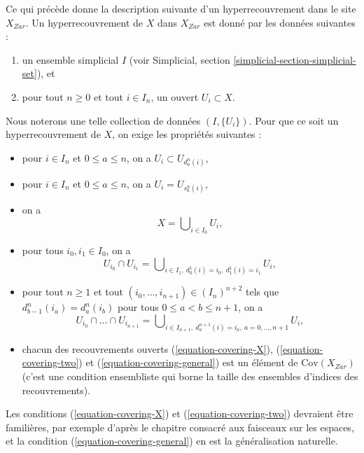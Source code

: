 \medskip\noindent
Ce qui précède donne la description suivante d'un hyperrecouvrement
dans le site $X_{Zar}$. Un hyperrecouvrement de $X$ dans $X_{Zar}$
est donné par les données suivantes :
\begin{enumerate}
\item un ensemble simplicial $I$ (voir
Simplicial, section \ref{simplicial-section-simplicial-set}), et
\item pour tout $n \geq 0$ et tout $i \in I_n$, un ouvert $U_i \subset X$.
\end{enumerate}
Nous noterons une telle collection de données $(I, \{U_i\})$.
Pour que ce soit un hyperrecouvrement de $X$, on exige
les propriétés suivantes :
\begin{itemize}
\item pour $i \in I_n$ et $0 \leq a \leq n$,
on a $U_i \subset U_{d^n_a(i)}$,
\item pour $i \in I_n$ et $0 \leq a \leq n$, on a $U_i = U_{s^n_a(i)}$,
\item on a
\begin{equation}
\label{equation-covering-X}
X = \bigcup\nolimits_{i \in I_0} U_i,
\end{equation}
\item pour tous $i_0, i_1 \in I_0$, on a
\begin{equation}
\label{equation-covering-two}
U_{i_0} \cap U_{i_1} =
\bigcup\nolimits_{i \in I_1, \ d^1_0(i) = i_0, \ d^1_1(i) = i_1} U_i,
\end{equation}
\item pour tout $n \geq 1$ et tout
$(i_0, \ldots, i_{n + 1}) \in (I_n)^{n + 2}$ tels que
$d^n_{b - 1}(i_a) = d^n_a(i_b)$ pour tous $0\leq a < b\leq n + 1$,
on a
\begin{equation}
\label{equation-covering-general}
U_{i_0} \cap \ldots \cap U_{i_{n + 1}} =
\bigcup\nolimits_{i \in I_{n + 1},
\ d^{n + 1}_a(i) = i_a, \ a = 0, \ldots, n + 1} U_i,
\end{equation}
\item chacun des recouvrements ouverts (\ref{equation-covering-X}),
(\ref{equation-covering-two}) et (\ref{equation-covering-general})
est un élément de $\text{Cov}(X_{Zar})$
(c'est une condition ensembliste qui borne
la taille des ensembles d'indices des recouvrements).
\end{itemize}
Les conditions (\ref{equation-covering-X}) et
(\ref{equation-covering-two}) devraient être familières, par exemple d'après le
chapitre consacré aux faisceaux sur les espaces, et la condition
(\ref{equation-covering-general}) en est la généralisation naturelle.

